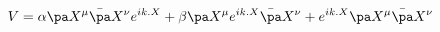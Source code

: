 \begin{equation}
V=\alpha \pa X^\mu\bar\pa X^\nu e^{ik.X}+\beta \pa X^\mu e^{ik.X}\bar\pa X^\nu+
e^{ik.X} \pa X^\mu\bar\pa X^\nu
\end{equation}

